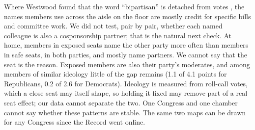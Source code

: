 Where Westwood found that the word ``bipartisan'' is detached from votes \cite{westwood2022}, the names members use
across the aisle on the floor are mostly credit for specific bills and committee work. We did not test, pair by
pair, whether each named colleague is also a cosponsorship partner; that is the natural next check. At home, members in exposed seats name
the other party more often than members in safe seats, in both parties, and mostly name partners. We cannot say
that the seat is the reason. Exposed members are also their party's moderates, and among members of similar
ideology little of the gap remains (1.1 of 4.1 points for Republicans, 0.2 of 2.6 for Democrats). Ideology is
measured from roll-call votes, which a close seat may itself shape, so holding it fixed may remove part of a real
seat effect; our data cannot separate the two. One Congress and one chamber cannot say
whether these patterns are stable. The same two maps can be drawn for any Congress since the Record went online.
